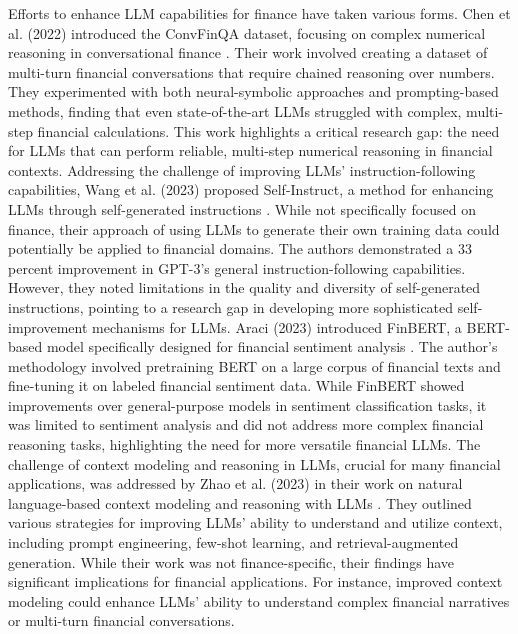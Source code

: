 \documentclass[logo,msc]{infthesis}           %
\begin{document}
Efforts to enhance LLM capabilities for finance have taken various forms. Chen et al. (2022) introduced the ConvFinQA dataset, focusing on complex numerical reasoning in conversational finance \cite{chen2022ConvFinQA}. Their work involved creating a dataset of multi-turn financial conversations that require chained reasoning over numbers. They experimented with both neural-symbolic approaches and prompting-based methods, finding that even state-of-the-art LLMs struggled with complex, multi-step financial calculations. This work highlights a critical research gap: the need for LLMs that can perform reliable, multi-step numerical reasoning in financial contexts.
Addressing the challenge of improving LLMs' instruction-following capabilities, Wang et al. (2023) proposed Self-Instruct, a method for enhancing LLMs through self-generated instructions \cite{wang2023selfinstruct}. While not specifically focused on finance, their approach of using LLMs to generate their own training data could potentially be applied to financial domains. The authors demonstrated a 33 percent improvement in GPT-3's general instruction-following capabilities. However, they noted limitations in the quality and diversity of self-generated instructions, pointing to a research gap in developing more sophisticated self-improvement mechanisms for LLMs.
Araci (2023) introduced FinBERT, a BERT-based model specifically designed for financial sentiment analysis \cite{araci2019finbertfinancialsentimentanalysis}. The author's methodology involved pretraining BERT on a large corpus of financial texts and fine-tuning it on labeled financial sentiment data. While FinBERT showed improvements over general-purpose models in sentiment classification tasks, it was limited to sentiment analysis and did not address more complex financial reasoning tasks, highlighting the need for more versatile financial LLMs.
The challenge of context modeling and reasoning in LLMs, crucial for many financial applications, was addressed by Zhao et al. (2023) in their work on natural language-based context modeling and reasoning with LLMs \cite{xiong2023naturallanguagebasedcontext}. They outlined various strategies for improving LLMs' ability to understand and utilize context, including prompt engineering, few-shot learning, and retrieval-augmented generation. While their work was not finance-specific, their findings have significant implications for financial applications. For instance, improved context modeling could enhance LLMs' ability to understand complex financial narratives or multi-turn financial conversations. 
\end{document}
